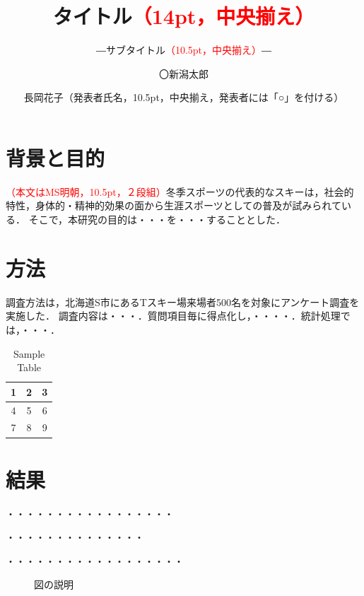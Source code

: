 \documentclass{css2025}
\title{
	タイトル\textcolor{red}{（14pt，中央揃え）}
}
\subtitle{
    ―サブタイトル\textcolor{red}{（10.5pt，中央揃え）}―
}
\author[1]{〇新潟太郎}
\author[2]{長岡花子（発表者氏名，10.5pt，中央揃え，発表者には「○」を付ける）}
\affil[1)]{冬季大学\textcolor{red}{（発表者の所属）}}
\affil[2)]{スポーツ大学\textcolor{red}{（発表者の所属）}}
\begin{document}
\maketitle

\section{背景と目的}
\textcolor{red}{（本文はMS明朝，10.5pt，２段組）}冬季スポーツの代表的なスキーは，社会的特性，身体的・精神的効果の面から生涯スポーツとしての普及が試みられている．
そこで，本研究の目的は・・・を・・・することとした．

\newpage

\section{方法}
調査方法は，北海道S市にあるTスキー場来場者500名を対象にアンケート調査を実施した．
調査内容は・・・．質問項目毎に得点化し，・・・・．統計処理では，・・・．

\newpage


\begin{table}[h]
    \centering
    \caption{Sample Table}
    \begin{tabular}{|c|c|c|}
        \hline
        1 & 2 & 3 \\
        \hline
        4 & 5 & 6 \\
        \hline
        7 & 8 & 9 \\
        \hline
    \end{tabular}
    \label{tab:sample}
\end{table}

\section{結果}
・・・・・・・・・・・・・・・・・

・・・・・・・・・・・・・・

・・・・・・・・・・・・・・・・・・

\begin{figure}[htbp]
    \centering
    \caption{図の説明 \cite{cite:niigata2024} \cite{cite:青空文庫Aozo22:online}}
    \label{fig:fig1}
\end{figure}



\end{document}
